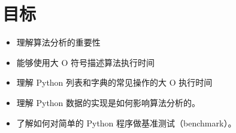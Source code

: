 \section{目标}
\begin{itemize}
\item 理解算法分析的重要性
\item 能够使用大 O 符号描述算法执行时间
\item 理解 Python 列表和字典的常见操作的大 O 执行时间
\item 理解 Python 数据的实现是如何影响算法分析的。
\item 了解如何对简单的 Python 程序做基准测试（benchmark）。
\end{itemize}